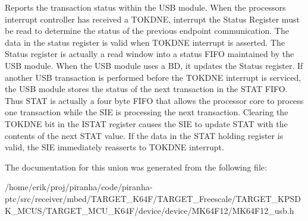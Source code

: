 Reports the transaction status within the U\+SB module. When the processor\textquotesingle{}s interrupt controller has received a T\+O\+K\+D\+NE, interrupt the Status Register must be read to determine the status of the previous endpoint communication. The data in the status register is valid when T\+O\+K\+D\+NE interrupt is asserted. The Status register is actually a read window into a status F\+I\+FO maintained by the U\+SB module. When the U\+SB module uses a BD, it updates the Status register. If another U\+SB transaction is performed before the T\+O\+K\+D\+NE interrupt is serviced, the U\+SB module stores the status of the next transaction in the S\+T\+AT F\+I\+FO. Thus S\+T\+AT is actually a four byte F\+I\+FO that allows the processor core to process one transaction while the S\+IE is processing the next transaction. Clearing the T\+O\+K\+D\+NE bit in the I\+S\+T\+AT register causes the S\+IE to update S\+T\+AT with the contents of the next S\+T\+AT value. If the data in the S\+T\+AT holding register is valid, the S\+IE immediately reasserts to T\+O\+K\+D\+NE interrupt. 

The documentation for this union was generated from the following file\+:\begin{DoxyCompactItemize}
\item 
/home/erik/proj/piranha/code/piranha-\/ptc/src/receiver/mbed/\+T\+A\+R\+G\+E\+T\+\_\+\+K64\+F/\+T\+A\+R\+G\+E\+T\+\_\+\+Freescale/\+T\+A\+R\+G\+E\+T\+\_\+\+K\+P\+S\+D\+K\+\_\+\+M\+C\+U\+S/\+T\+A\+R\+G\+E\+T\+\_\+\+M\+C\+U\+\_\+\+K64\+F/device/device/\+M\+K64\+F12/M\+K64\+F12\+\_\+usb.\+h\end{DoxyCompactItemize}
